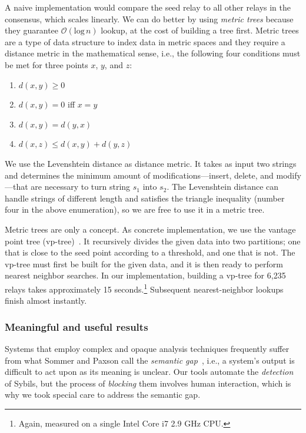 A naive implementation would compare the seed relay to all other relays in the
consensus, which scales linearly.  We can do better by using \emph{metric trees}
because they guarantee $\mathcal{O}(\textrm{log}\,n)$ lookup, at the cost of
building a tree first.  Metric trees are a type of data structure to index data
in metric spaces and they require a distance metric in the mathematical sense,
i.e., the following four conditions must be met for three points $x$, $y$, and
$z$:
\begin{enumerate}
	\item $d(x, y) \geq 0$
	\item $d(x, y) = 0$ iff $x = y$
	\item $d(x, y) = d(y, x)$
	\item $d(x, z) \leq d(x, y) + d(y, z)$
\end{enumerate}

We use the Levenshtein distance as distance metric.  It takes as input two
strings and determines the minimum amount of modifications---insert, delete, and
modify---that are necessary to turn string $s_{1}$ into $s_{2}$.  The
Levenshtein distance can handle strings of different length and satisfies the
triangle inequality (number four in the above enumeration), so we are free to
use it in a metric tree.

Metric trees are only a concept.  As concrete implementation, we use the vantage
point tree (vp-tree)~\cite{Yianilos1993a}.  It recursively divides the given
data into two partitions; one that is close to the seed point according to a
threshold, and one that is not.  The vp-tree must first be built for the given
data, and it is then ready to perform nearest neighbor searches.  In our
implementation, building a vp-tree for 6,235 relays takes approximately 15
seconds.\footnote{Again, measured on a single Intel Core i7 2.9 GHz CPU.}
Subsequent nearest-neighbor lookups finish almost instantly.


\subsubsection{Meaningful and useful results}
Systems that employ complex and opaque analysis techniques frequently suffer
from what Sommer and Paxson call the \emph{semantic gap}~\cite[\S
III.C]{Sommer2010a}, i.e., a system's output is difficult to act upon as its
meaning is unclear.  Our tools automate the \emph{detection} of Sybils, but the
process of \emph{blocking} them involves human interaction, which is why we took
special care to address the semantic gap.


